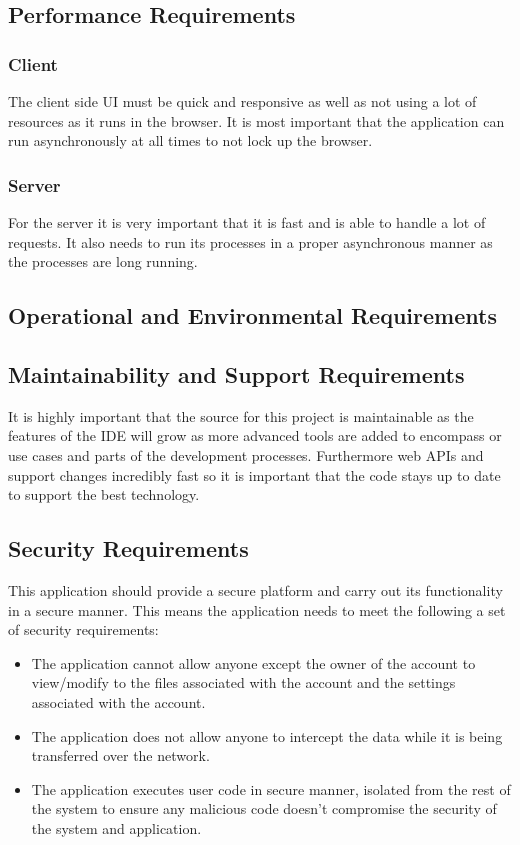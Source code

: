 \documentclass[12pt, titlepage]{article}
\begin{document}
  \subsection{Performance Requirements}
    \subsubsection{Client}
    The client side UI must be quick and responsive as well as not using a 
    lot of resources as it runs in the browser. It is most important that the 
    application can run asynchronously at all times to not lock up the browser.
    
    \subsubsection{Server}
    For the server it is very important that it is fast and is able to handle 
    a lot of requests. It also needs to run its processes in a proper 
    asynchronous manner as the processes are long running.

  \subsection{Operational and Environmental Requirements}

  \subsection{Maintainability and Support Requirements}
  It is highly important that the source for this project is maintainable as 
  the features of the IDE will grow as more advanced tools are added to 
  encompass or use cases and parts of the development processes. Furthermore 
  web APIs and support changes incredibly fast so it is important that the code
   stays up to date to support the best technology.

  \subsection{Security Requirements}
  This application should provide a secure platform and carry out its
  functionality in a secure manner. This means the application needs to meet
  the following a set of security requirements:
  \begin{itemize}
    \item The application cannot allow anyone except the owner of the account
      to view/modify to the files associated with the account and the settings
      associated with the account.
    \item The application does not allow anyone to intercept the data while it
      is being transferred over the network.
    \item The application executes user code in secure manner, isolated from
      the rest of the system to ensure any malicious code doesn't compromise
      the security of the system and application.
  \end{itemize}
\end{document}

